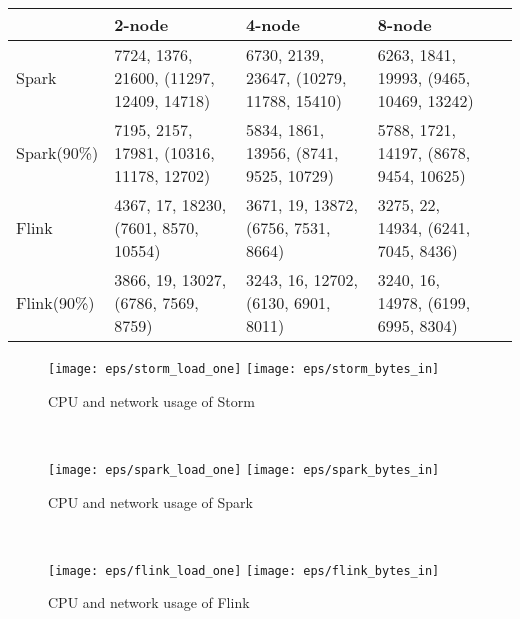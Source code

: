 \setlength{\tabcolsep}{0.1em} %
{\renewcommand{\arraystretch}{1.0}%
    \begin{table*}
        \resizebox{\textwidth}{!} {\begin{tabular}{lllll}\toprule
            &\textbf{2-node}  & \textbf{4-node} & \textbf{8-node}\\\midrule
            Spark & 7724, 1376, 21600, (11297, 12409, 14718) & 6730, 2139, 23647, (10279, 11788, 15410) & 6263, 1841, 19993, (9465, 10469, 13242) \\
            Spark(90\%) & 7195, 2157, 17981, (10316, 11178, 12702) & 5834, 1861, 13956, (8741, 9525, 10729) & 5788, 1721, 14197, (8678, 9454, 10625)\\
            Flink & 4367, 17, 18230, (7601, 8570, 10554) & 3671, 19, 13872, (6756, 7531, 8664) & 3275, 22, 14934, (6241, 7045, 8436) \\
            Flink(90\%) & 3866, 19, 13027, (6786, 7569, 8759) & 3243, 16, 12702, (6130, 6901, 8011)  & 3240, 16, 14978, (6199, 6995, 8304) \\
        \end{tabular}}
        \caption{Latency statistics, avg, min, max and quantiles (25, 50, 75) in milliseconds for windowed joins.}
                 \label{tab_lat_join}
    \end{table*} 


\begin{figure*}
   \centering

   \begin{subfigure}[b]{0.3\textwidth}
       \texttt{[image: eps/storm\_load\_one]}
        \texttt{[image: eps/storm\_bytes\_in]}

       \caption{CPU and network usage of Storm }
   \end{subfigure}
      ~ 
   \begin{subfigure}[b]{0.3\textwidth}
       \texttt{[image: eps/spark\_load\_one]}
        \texttt{[image: eps/spark\_bytes\_in]}

       \caption{CPU and network usage of Spark }
   \end{subfigure}
   ~ 
   \begin{subfigure}[b]{0.3\textwidth}
       \texttt{[image: eps/flink\_load\_one]}
        \texttt{[image: eps/flink\_bytes\_in]}

       \caption{CPU and network usage of Flink }
   \end{subfigure}


\end{figure*}}
